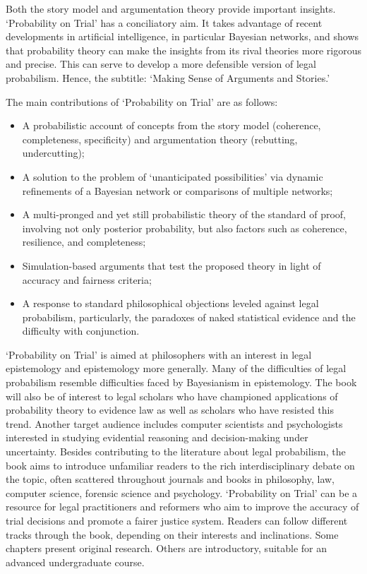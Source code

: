 \documentclass[
  10pt,
  dvipsnames,enabledeprecatedfontcommands]{scrartcl}
\begin{document}
Both the story model and argumentation theory provide important
insights. `Probability on Trial' has a conciliatory aim. It takes
advantage of recent developments in artificial intelligence, in
particular Bayesian networks, and shows that probability theory can make
the insights from its rival theories more rigorous and precise. This can
serve to develop a more defensible version of legal probabilism. Hence,
the subtitle: `Making Sense of Arguments and Stories.'

The main contributions of `Probability on Trial' are as follows:

\begin{itemize}
\item A probabilistic account of concepts from the story model (coherence, completeness, specificity) and argumentation theory (rebutting, undercutting);
\item A solution to the problem of `unanticipated possibilities'  via dynamic refinements of a Bayesian network or comparisons of multiple networks;
\item A multi-pronged and yet still probabilistic theory of the standard of proof, involving not only posterior probability, but also  factors such as  coherence, resilience, and completeness;
\item Simulation-based arguments that test the proposed theory in light of accuracy and fairness criteria;
\item A response to standard philosophical objections leveled against legal probabilism, particularly, the paradoxes of naked statistical evidence and the difficulty with conjunction. 
\end{itemize}

`Probability on Trial' is aimed at philosophers with an interest in
legal epistemology and epistemology more generally. Many of the
difficulties of legal probabilism resemble difficulties faced by
Bayesianism in epistemology. The book will also be of interest to legal
scholars who have championed applications of probability theory to
evidence law as well as scholars who have resisted this trend. Another
target audience includes computer scientists and psychologists
interested in studying evidential reasoning and decision-making under
uncertainty. Besides contributing to the literature about legal
probabilism, the book aims to introduce unfamiliar readers to the rich
interdisciplinary debate on the topic, often scattered throughout
journals and books in philosophy, law, computer science, forensic
science and psychology. `Probability on Trial' can be a resource for
legal practitioners and reformers who aim to improve the accuracy of
trial decisions and promote a fairer justice system. Readers can follow
different tracks through the book, depending on their interests and
inclinations. Some chapters present original research. Others are
introductory, suitable for an advanced undergraduate course.
\end{document}
